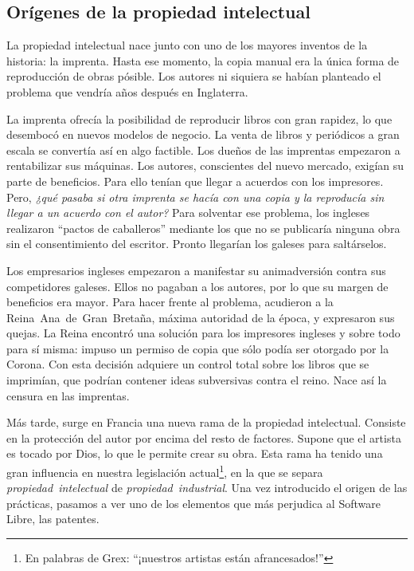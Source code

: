 \subsection{Orígenes de la propiedad intelectual}
La propiedad intelectual nace junto con uno de los mayores inventos de
la historia: la imprenta. Hasta ese momento, la copia manual era la
única forma de reproducción de obras pósible. Los autores ni siquiera
se habían planteado el problema que vendría años después en
Inglaterra.

La imprenta ofrecía la posibilidad de reproducir libros con gran
rapidez, lo que desembocó en nuevos modelos de negocio. La venta de
libros y periódicos a gran escala se convertía así en algo
factible. Los dueños de las imprentas empezaron a rentabilizar sus
máquinas. Los autores, conscientes del nuevo mercado, exigían su parte
de beneficios. Para ello tenían que llegar a acuerdos con los
impresores. Pero, \emph{¿qué pasaba si otra imprenta se hacía con una
  copia y la reproducía sin llegar a un acuerdo con el autor?} Para
solventar ese problema, los ingleses realizaron ``pactos de
caballeros'' mediante los que no se publicaría ninguna obra sin el
consentimiento del escritor. Pronto llegarían los galeses para
saltárselos.

Los empresarios ingleses empezaron a manifestar su animadversión
contra sus competidores galeses. Ellos no pagaban a los autores, por
lo que su margen de beneficios era mayor. Para hacer frente al
problema, acudieron a la Reina~Ana~de~Gran~Bretaña, máxima autoridad
de la época, y expresaron sus quejas. La Reina encontró una solución
para los impresores ingleses y sobre todo para sí misma: impuso un
permiso de copia que sólo podía ser otorgado por la Corona. Con esta
decisión adquiere un control total sobre los libros que se imprimían,
que podrían contener ideas subversivas contra el reino. Nace así la
censura en las imprentas.

Más tarde, surge en Francia una nueva rama de la propiedad
intelectual. Consiste en la protección del autor por encima del resto
de factores. Supone que el artista es tocado por Dios, lo que le
permite crear su obra. Esta rama ha tenido una gran influencia en
nuestra legislación actual\footnote{En palabras de Grex: ``¡nuestros
  artistas están afrancesados!''}, en la que se separa
\emph{propiedad~intelectual} de \emph{propiedad~industrial}. Una vez
introducido el origen de las prácticas, pasamos a ver uno de los
elementos que más perjudica al Software Libre, las patentes.

